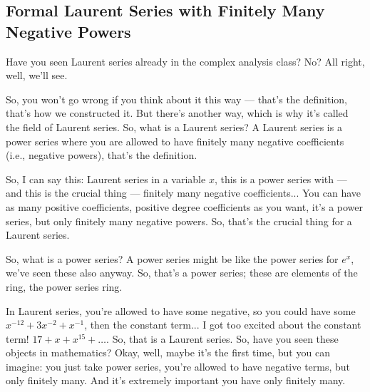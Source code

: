 \subsection{Formal Laurent Series with Finitely Many Negative Powers}

\begin{speech}[00:10:48 - 00:12:45]
Have you seen Laurent series already in the complex analysis class? No? All right, well, we'll see. 

So, you won't go wrong if you think about it this way --- that's the definition, that's how we constructed it. But there's another way, which is why it's called the field of Laurent series. So, what is a Laurent series? A Laurent series is a power series where you are allowed to have finitely many negative coefficients (i.e., negative powers), that's the definition. 

So, I can say this:  Laurent series in a variable $x$, this is a power series with --- and this is the crucial thing ---  finitely many negative coefficients...  You can have as many positive coefficients, positive degree coefficients as you want, it's a power series, but only finitely many negative powers. So, that's the crucial thing for a Laurent series. 

So, what is a power series? A power series might be like the power series for $e^x$,  we've seen these also anyway. So, that's a power series; these are elements of the ring, the power series ring. 

In Laurent series, you're allowed to have some negative, so you could have some $x^{-12} + 3 x^{-2} + x^{-1}$, then the constant term... I got too excited about the constant term! $17 + x + x^{15} + \dots$.  So, that is a Laurent series. So, have you seen these objects in mathematics? Okay, well, maybe it's the first time, but you can imagine: you just take power series, you're allowed to have negative terms, but only finitely many. And it's extremely important you have only finitely many.
\end{speech}


